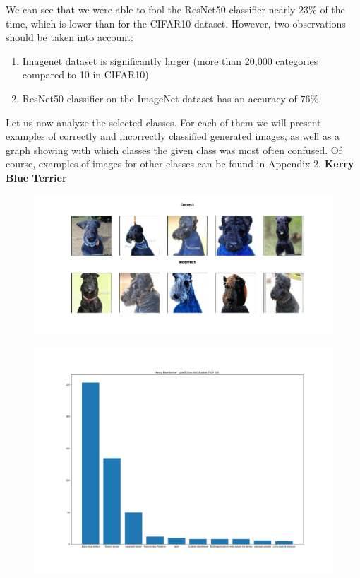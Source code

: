 \documentclass[12pt,a4paper,openany]{book}
\begin{document}
We can see that we were able to fool the ResNet50 classifier nearly $23\%$ of the time, which is lower than for the CIFAR10 dataset. However, two observations should be taken into account:
\begin{enumerate}
\item Imagenet dataset is significantly larger (more than 20,000 categories compared to 10 in CIFAR10)
\item ResNet50 classifier on the ImageNet dataset has an accuracy of $76\%$.
\end{enumerate}
Let us now analyze the selected classes. For each of them we will present examples of correctly and incorrectly classified generated images, as well as a graph showing with which classes the given class was most often confused.  
Of course, examples of images for other classes can be found in Appendix 2.
\newpage
\noindent \textbf{Kerry Blue Terrier} \\
\begin{figure}[ht!]
    \centering
    \includegraphics[scale=0.3]{figs/imagenet_examples/Kerry blue terrier.png}
\end{figure}
\begin{figure}[ht!]
    \centering
    \includegraphics[scale=0.3]{figs/imagenet_examples/Kerry blue terrier_imagenet_dist.png}
\end{figure}
\end{document}

